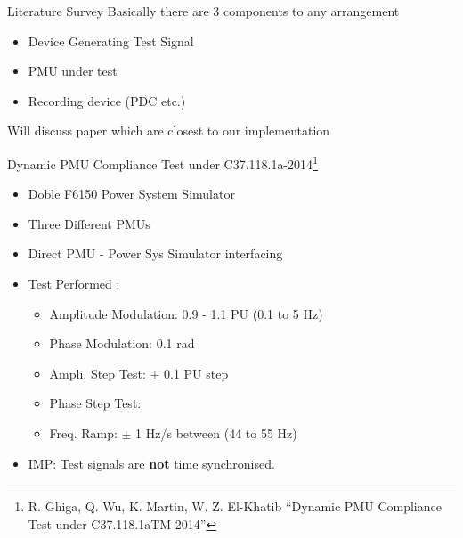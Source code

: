 \documentclass{beamer}
\begin{document}

\begin{frame}{Literature Survey}
Basically there are 3 components to any arrangement
\begin{itemize}
\item Device Generating Test Signal
\item PMU under test
\item Recording device (PDC etc.)
\end{itemize}

 Will discuss paper which are closest to our implementation
\end{frame}

\begin{frame}{Dynamic PMU Compliance Test under C37.118.1a-2014\footnote{R. Ghiga, Q. Wu, K. Martin, W. Z. El-Khatib “Dynamic PMU Compliance
Test under C37.118.1aTM-2014”}}

\begin{itemize}
\item Doble F6150 Power System Simulator
\item Three Different PMUs
\item Direct PMU - Power Sys Simulator interfacing
\item Test Performed \cite{Paper:ghiga} : 

\begin{itemize}
	\item Amplitude Modulation: 0.9 - 1.1 PU (\@ 0.1 to 5 Hz)
	\item Phase Modulation: 0.1 rad
	\item Ampli. Step Test: $\pm$ 0.1 PU step
	\item Phase Step Test: 
	\item Freq. Ramp: $\pm$ 1 Hz/s between (44 to 55 Hz)
\end{itemize}
\item IMP: Test signals are \textbf{not} time synchronised.
\end{itemize}

\end{frame}
\end{document}
